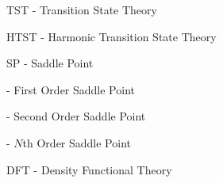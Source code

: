 TST - Transition State Theory

HTST - Harmonic Transition State Theory

SP - Saddle Point

 - First Order Saddle Point

 - Second Order Saddle Point

 - $N$th Order Saddle Point

DFT - Density Functional Theory
